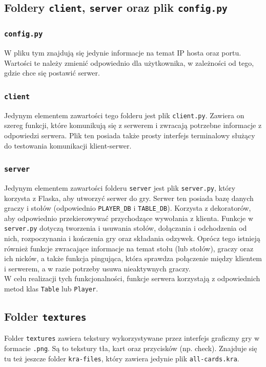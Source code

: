 \documentclass{article}
\begin{document}
\subsection{Foldery \texttt{client}, \texttt{server} oraz plik \texttt{config.py}}

\subsubsection{\texttt{config.py}}
W pliku tym znajdują się jedynie informacje na temat IP hosta oraz portu. Wartości te należy zmienić odpowiednio dla użytkownika, w zależności od tego, gdzie chce się postawić serwer.

\subsubsection{\texttt{client}}
Jedynym elementem zawartości tego folderu jest plik \texttt{client.py}. Zawiera on szereg funkcji, które komunikują się z serwerem i zwracają potrzebne informacje z odpowiedzi serwera. Plik ten posiada także prosty interfejs terminalowy służący do testowania komunikacji klient-serwer.

\subsubsection{\texttt{server}}
Jedynym elementem zawartości folderu \texttt{server} jest plik \texttt{server.py}, który korzysta z Flaska, aby utworzyć serwer do gry. Serwer ten posiada bazę danych graczy i stołów (odpowiednio \texttt{PLAYER\_DB} i \texttt{TABLE\_DB}). Korzysta z dekoratorów, aby odpowiednio przekierowywać przychodzące wywołania z klienta. Funkcje w \texttt{server.py} dotyczą tworzenia i usuwania stołów, dołączania i odchodzenia od nich, rozpoczynania i kończenia gry oraz składania odzywek. Oprócz tego istnieją również funkcje zwracające informacje na temat stołu (lub stołów), graczy oraz ich nicków, a także funkcja pingująca, która sprawdza połączenie między klientem i serwerem, a w razie potrzeby usuwa nieaktywnych graczy.\\
W celu realizacji tych funkcjonalności, funkcje serwera korzystają z odpowiednich metod klas \texttt{Table} lub \texttt{Player}.

\subsection{Folder \texttt{textures}}
Folder \texttt{textures} zawiera tekstury wykorzystywane przez interfejs graficzny gry w formacie \texttt{.png}. Są to tekstury tła, kart oraz przycisków (np. check). Znajduje się tu też jeszcze folder \texttt{kra-files}, który zawiera jedynie plik \texttt{all-cards.kra}.
\end{document}
